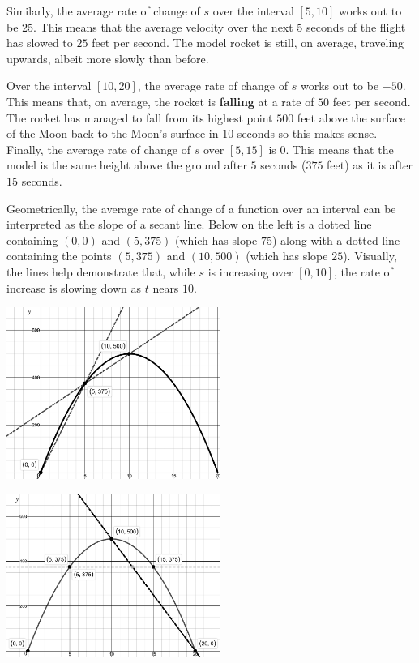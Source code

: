 \documentclass{ximera}
\begin{document}
\begin{example}
\begin{enumerate}
Similarly, the average rate of change of $s$ over the interval $[5, 10]$ works out to be $25$.  This means that the average velocity over the next $5$ seconds of the flight has slowed to $25$ feet per second. The model rocket is still, on average, traveling upwards, albeit more slowly than before.  



Over the interval $[10, 20]$, the average rate of change of $s$ works out to be $-50$.  This means that, on average, the rocket is \textbf{falling} at a rate of $50$ feet per second.  The rocket has managed to fall from its highest point $500$ feet above the surface of the Moon back to the Moon's surface in $10$ seconds so this makes sense. Finally, the average rate of change of $s$ over $[5, 15]$ is $0$.  This means that the model is the same height above the ground after $5$ seconds ($375$ feet) as it is after $15$ seconds.    



Geometrically, the average rate of change of a function over an interval can be interpreted as the slope of a secant line. Below on the left is a dotted line containing $(0, 0)$ and $(5, 375)$ (which has slope $75$) along with a dotted line containing the points $(5, 375)$ and $(10, 500)$ (which has slope $25$).  Visually, the lines help demonstrate that, while $s$ is increasing over $[0, 10]$, the rate of increase is slowing down as $t$ nears $10$.  



\begin{multicols}{2}


\includegraphics[width=2.75in]{./ConstantandLinearFunctionsGraphics/ARCRocketExample02.jpg}

\includegraphics[width=2.75in]{./ConstantandLinearFunctionsGraphics/ARCRocketExample03.jpg}



\end{multicols}
\end{enumerate}
\end{example}
\end{document}
